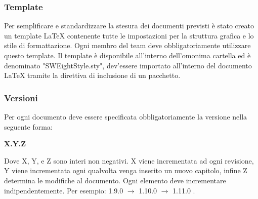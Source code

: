 \subsubsection{Template}
Per semplificare e standardizzare la stesura dei documenti previsti è stato creato un template \LaTeX{} contenente tutte le impostazioni per la struttura grafica e lo stile di formattazione. Ogni membro del team deve obbligatoriamente utilizzare questo template.
Il template è disponibile all'interno dell'omonima cartella ed è denominato "SWEightStyle.sty", dev'essere importato all'interno del documento \LaTeX{} tramite la direttiva di inclusione di un pacchetto.
\subsubsection{Versioni}
Per ogni documento deve essere specificata obbligatoriamente la versione nella seguente forma: 
\begin{center}
\textbf{X.Y.Z}
\end{center}
Dove X, Y, e Z sono interi non negativi. X viene incrementata ad ogni revisione, Y viene incrementata ogni qualvolta venga inserito un nuovo capitolo, infine Z determina le modifiche al documento. Ogni elemento deve incrementare indipendentemente. Per esempio: 1.9.0 $\rightarrow$ 1.10.0 $\rightarrow$ 1.11.0 .


